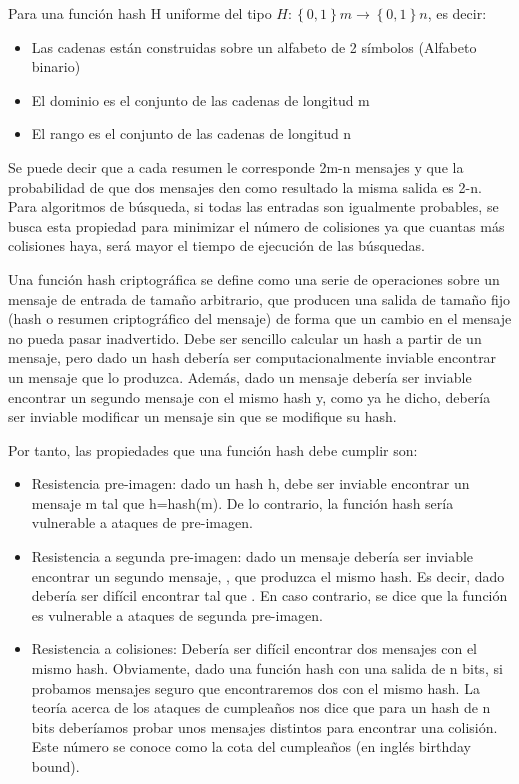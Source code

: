 \documentclass[spanish]{article}
\begin{document}
Para una función hash H uniforme del tipo $H:\left\{ 0,1 \right\} m\rightarrow \left\{ 0,1 \right\} n$, es decir:
\begin{itemize}
\item Las cadenas están construidas sobre un alfabeto de 2 símbolos (Alfabeto binario)
\item El dominio es el conjunto de las cadenas de longitud m
\item El rango es el conjunto de las cadenas de longitud n\\
\end{itemize}
Se puede decir que a cada resumen le corresponde 2m-n mensajes y que la probabilidad de que dos mensajes den como resultado la misma salida es 2-n. Para algoritmos de búsqueda, si todas las entradas son igualmente probables, se busca esta propiedad para minimizar el número de colisiones ya que cuantas más colisiones haya, será mayor el tiempo de ejecución de las búsquedas.

Una función hash criptográfica se define como una serie de operaciones sobre un mensaje de entrada de tamaño arbitrario, que producen una salida de tamaño fijo (hash o resumen criptográfico del mensaje) de forma que un cambio en el mensaje no pueda pasar inadvertido. Debe ser sencillo calcular un hash a partir de un mensaje, pero dado un hash debería ser computacionalmente inviable encontrar un mensaje que lo produzca. Además, dado un mensaje debería ser inviable encontrar un segundo mensaje con el mismo hash y, como ya he dicho, debería ser inviable modificar un mensaje sin que se modifique su hash.

Por tanto, las propiedades que una función hash debe cumplir son:
\begin{itemize}
\item Resistencia pre-imagen: dado un hash h, debe ser inviable encontrar un mensaje m tal que h=hash(m). De lo contrario, la función hash sería vulnerable a ataques de pre-imagen.
\item Resistencia a segunda pre-imagen: dado un mensaje  debería ser inviable encontrar un segundo mensaje, , que produzca el mismo hash. Es decir, dado  debería ser difícil encontrar  tal que . En caso contrario, se dice que la función es vulnerable a ataques de segunda pre-imagen.
\item Resistencia a colisiones: Debería ser difícil encontrar dos mensajes con el mismo hash. Obviamente, dado una función hash con una salida de n bits, si probamos   mensajes seguro que encontraremos dos con el mismo hash. La teoría acerca de los ataques de cumpleaños nos dice que para un hash de n bits deberíamos probar unos  mensajes distintos para encontrar una colisión. Este número se conoce como la cota del cumpleaños (en inglés birthday bound).
\end{itemize}
\end{document}
